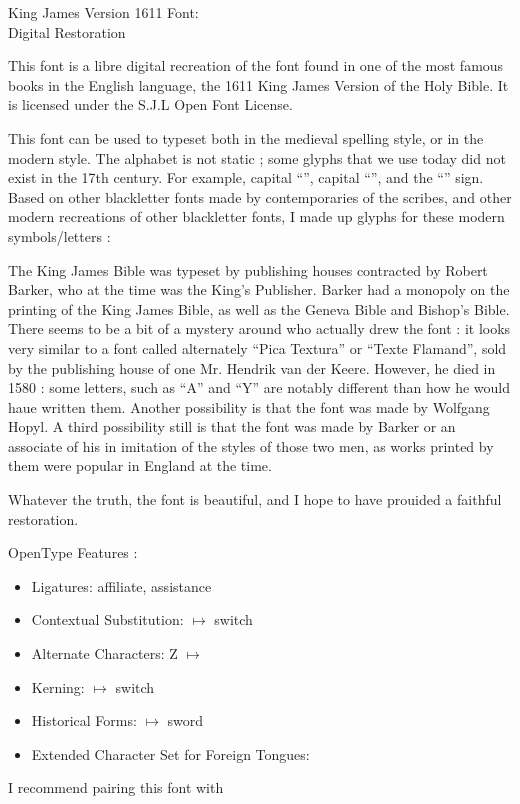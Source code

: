 \documentclass[border=15pt]{standalone}
\begin{document}
\begin{minipage}{4in}
\setlength{\parindent}{10pt}
\setlength{\parskip}{3ex plus 0.5ex minus 0.2ex}
    \begin{center}
{\huge{King James Version 1611 Font:\\Digital Restoration}}
    \end{center}

This font is a libre digital recreation of the font found in one of the most famous books in the English language, the 1611 King James Version of the Holy Bible. It is licensed under the S.J.L Open Font License.

This font can be used to typeset both in the medieval spelling style, or in the modern style. The alphabet is not static ; some glyphs that we use today did not exist in the 17th century. For example, capital “{}”, capital “{}”, and the “{}” sign. Based on other blackletter fonts made by contemporaries of the scribes, and other modern recreations of other blackletter fonts, I made up glyphs for these modern symbols/letters : {}

The King James Bible was typeset by publishing houses contracted by Robert Barker, who at the time was the King’s Publisher. Barker had a monopoly on the printing of the King James Bible, as well as the Geneva Bible and Bishop’s Bible. There seems to be a bit of a mystery around who actually drew the font : it looks very similar to a font called alternately “Pica Textura” or “Texte Flamand”, sold by the publishing house of one Mr. Hendrik van der Keere. However, he died in 1580 : some letters, such as “A” and “Y” are notably different than how he would haue written them. Another possibility is that the font was made by Wolfgang Hopyl. A third possibility still is that the font was made by Barker or an associate of his in imitation of the styles of those two men, as works printed by them were popular in England at the time.

Whatever the truth, the font is beautiful, and I hope to have prouided a faithful restoration.

OpenType Features :
    \begin{itemize}
        \item Ligatures: affiliate, assistance
\item Contextual Substitution: {} $\mapsto$ switch
\item Alternate Characters: Z $\mapsto$ {}
\item Kerning: {} $\mapsto$ switch
\item Historical Forms: {} $\mapsto$ sword
\item Extended Character Set for Foreign Tongues: {\color{BrickRed}}
    \end{itemize}
    I recommend pairing this font with {}
\end{minipage}
\end{document}
